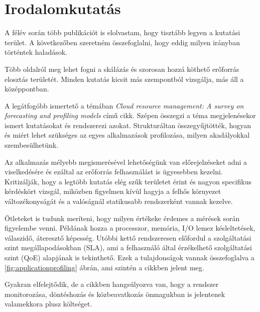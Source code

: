 \chapter{Irodalomkutatás}
\label{sec:Publications}
A félév során több publikációt is elolvastam, hogy tisztább legyen a kutatási terület. A következőben szeretném összefoglalni, hogy eddig milyen irányban történtek haladások.

Több oldalról meg lehet fogni a skálázás és szorosan hozzá köthető erőforrás elosztás területét. Minden kutatás kicsit más szempontból vizsgálja, más áll a középpontban.

A legátfogóbb ismertető a témában \emph{Cloud resource management: A survey on forecasting and profiling models}\citep{CloudResourceManagement} című cikk. Szépen összegzi a téma megjelenésekor ismert kutatásokat és rendszerezi azokat. Strukturáltan összegyűjtötték, hogyan és miért lehet szükséges az egyes alkalmazások profilozása, milyen akadályokkal szembesülhetünk.

Az alkalmazás mélyebb megismerésével lehetőségünk van előrejelzéseket adni a viselkedésére és ezáltal az erőforrás felhasználást is ügyesebben kezelni. Kritizálják, hogy a legtöbb kutatás elég szűk területet érint és nagyon specifikus kérdéskört vizsgál, miközben figyelmen kívül hagyja a felhős környezet változékonyságát és a valóságnál statikusabb rendszerként vannak kezelve. 

Ötleteket is tudunk meríteni, hogy milyen értékeke érdemes a mérések során figyelembe venni. Példának hozza a processzor, memória, I/O lemez késleltetések, válaszidő, áteresztő képesség. Utóbbi kettő rendszeresen előfordul a szolgáltatási szint megállapodásokban (SLA), ami a felhasználó által érzékelhető szolgáltatási szint (QoE) alapjának is tekinthető. 
Ezek a tulajdonságok vannak összefoglalva a \ref{fig:applicationprofiling} ábrán, ami szintén a cikkben jelent meg.

Gyakran elfelejtődik, de a cikkben hangsúlyozva van, hogy a rendszer monitorozása, döntéshozás és közbeavatkozás önmagukban is jelentenek valamekkora plusz költséget. \\


